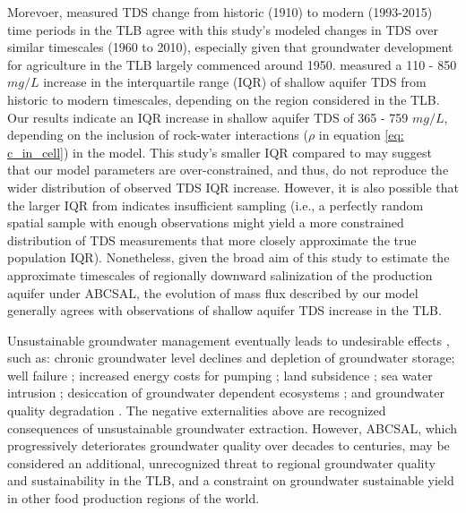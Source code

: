 Morevoer, measured TDS change from historic (1910) to modern (1993-2015) time periods in the TLB \citep{Hansen2018} agree with this study's modeled changes in TDS over similar timescales (1960 to 2010), especially given that groundwater development for agriculture in the TLB largely commenced around 1950. \cite{Hansen2018} measured a 110 - 850 $mg/L$ increase in the interquartile range (IQR) of %
shallow aquifer TDS %
from historic to modern timescales, depending on the region considered in the TLB. Our results indicate an IQR %
increase in shallow aquifer TDS of %
365 - 759 $mg/L$, depending on the inclusion of rock-water interactions ($\rho$ in equation \ref{eq: c_in_cell}) in the model. %
This study's smaller IQR compared to \cite{Hansen2018} may suggest that our model parameters are over-constrained, and thus, do not reproduce the wider distribution of observed TDS IQR increase. However, it is also possible that the larger IQR from \cite{Hansen2018} indicates insufficient sampling (i.e., a perfectly random spatial sample with enough observations might yield a more constrained distribution of TDS measurements that more closely approximate the true population IQR). Nonetheless, given the broad aim of this study %
to estimate the approximate timescales of regionally downward salinization of the production aquifer under ABCSAL, the evolution of mass flux described by our model generally agrees with observations of shallow aquifer TDS increase in the TLB.

Unsustainable groundwater management eventually leads to undesirable effects \citep{Giordano2009, SGMA}, such as: chronic groundwater level declines and depletion of groundwater storage; well failure \citep{pauloo2020domestic}; increased energy costs for pumping \citep{wada2010global}; land subsidence \citep{smith2017estimating}; sea water intrusion \citep{zektser2005environmental}; desiccation of groundwater dependent ecosystems \citep{TNC2014}; and groundwater quality degradation \citep{smith2018overpumping, Foster2000}. The negative externalities above are recognized consequences of unsustainable groundwater extraction. However, ABCSAL, which progressively deteriorates groundwater quality over decades to centuries, may be considered an additional, unrecognized threat to regional groundwater quality and sustainability in the TLB, and a constraint on groundwater sustainable yield in other food production regions of the world. 


